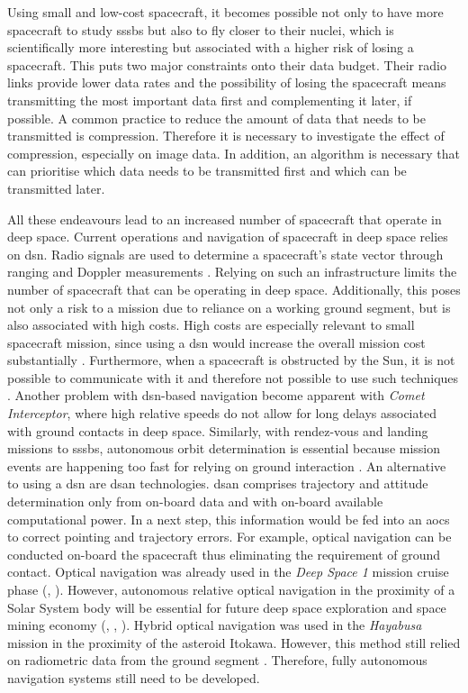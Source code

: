 Using small and low-cost spacecraft, it becomes possible not only to have more spacecraft to study \gls{sssb}s but also to fly closer to their nuclei, which is scientifically more interesting but associated with a higher risk of losing a spacecraft. This puts two major constraints onto their data budget. Their radio links provide lower data rates and the possibility of losing the spacecraft means transmitting the most important data first and complementing it later, if possible. A  common practice to reduce the amount of data that needs to be transmitted is compression. Therefore it is necessary to investigate the effect of compression, especially on image data. In addition, an algorithm is necessary that can prioritise which data needs to be transmitted first and which can be transmitted later.

All these endeavours lead to an increased number of spacecraft that operate in deep space. Current operations and navigation of spacecraft in deep space relies on \gls{dsn}. Radio signals are used to determine a spacecraft's state vector through ranging and Doppler measurements \cite{ramamurthy2015delta}. Relying on such an infrastructure limits the number of spacecraft that can be operating in deep space. Additionally, this poses not only a risk to a mission due to reliance on a working ground segment, but is also associated with high costs. High costs are especially relevant to small spacecraft mission, since using a \gls{dsn} would increase the overall mission cost substantially \cite{steffes2017deep}. Furthermore, when a spacecraft is obstructed by the Sun, it is not possible to communicate with it and therefore not possible to use such techniques \cite{kominato2006optical}. Another problem with \gls{dsn}-based navigation become apparent with \textit{Comet Interceptor}, where high relative speeds do not allow for long delays associated with ground contacts in deep space. Similarly, with rendez-vous and landing missions to \gls{sssb}s, autonomous orbit determination is essential because mission events are happening too fast for relying on ground interaction \cite{shuang2013imageprocessing}. An alternative to using a \gls{dsn} are \gls{dsan} technologies. \gls{dsan} comprises trajectory and attitude determination only from on-board data and with on-board available computational power. In a next step, this information would be fed into an \gls{aocs} to correct pointing and trajectory errors. For example, optical navigation can be conducted on-board the spacecraft thus eliminating the requirement of ground contact. Optical navigation was already used in the \textit{Deep Space 1} mission cruise phase (\cite{Riedel2000AutonomousReport}, \cite{bhaskaran2012autonomous}). However, autonomous relative optical navigation in the proximity of a Solar System body will be essential for future deep space exploration and space mining economy (\cite{steffes2017deep}, \cite{martin2006jpl}, \cite{probst2016mission}). Hybrid optical navigation was used in the \textit{Hayabusa} mission in the proximity of the asteroid Itokawa. However, this method still relied on radiometric data from the ground segment \cite{kominato2006optical}. Therefore, fully autonomous navigation systems still need to be developed.

